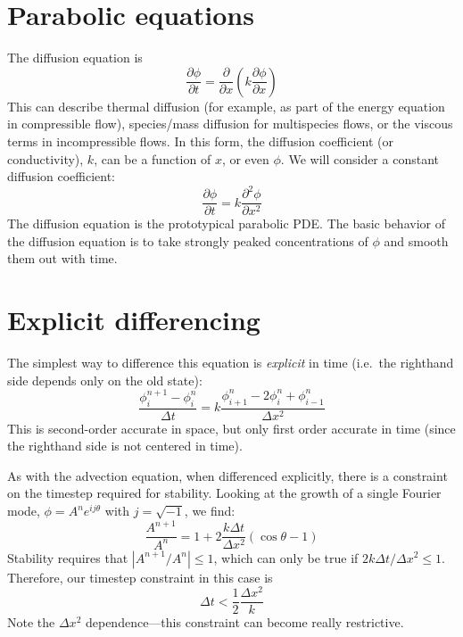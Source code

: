 
\begin{quote}
\end{quote}

\section{Parabolic equations}

The diffusion equation is
\begin{equation}
\frac{\partial \phi}{\partial t} = 
  \frac{\partial }{\partial x} 
  \left ( k \frac{\partial \phi}{\partial x} \right )
\end{equation}
This can describe thermal diffusion (for example, as part of the energy
equation in compressible flow), species/mass diffusion for multispecies
flows, or the viscous terms in incompressible flows.  In this form,
the diffusion coefficient (or conductivity), $k$, can be a function
of $x$, or even $\phi$.  We will consider a constant diffusion coefficient:
\begin{equation}
\frac{\partial \phi}{\partial t} = k \frac{\partial^2 \phi}{\partial x^2}
\end{equation}
The diffusion equation is the prototypical parabolic PDE.
The basic behavior of the diffusion equation is to take strongly peaked
concentrations of $\phi$ and smooth them out with time.



\section{Explicit differencing}

The simplest way to difference this equation is {\em explicit} in time
(i.e.\ the righthand side depends only on the old state):
\begin{equation}
\frac{\phi_i^{n+1} - \phi_i^n}{\Delta t} = 
  k \frac{\phi_{i+1}^n - 2\phi_i^n + \phi_{i-1}^n}{\Delta x^2}
\end{equation}
This is second-order accurate in space, but only first order accurate in
time (since the righthand side is not centered in time).

As with the advection equation, when differenced explicitly, there is
a constraint on the timestep required for stability.  Looking at the
growth of a single Fourier mode, $\phi = A^n e^{ij\theta}$ with $j =
\sqrt{-1}$, we find:
\begin{equation}
\frac{A^{n+1}}{A^n} = 1 + 2 \frac{k \Delta t}{\Delta x^2} ( \cos\theta - 1)
\end{equation}
Stability requires that $|A^{n+1}/A^n| \le 1$, which can only be true
if $2k\Delta t/\Delta x^2 \le 1$.  Therefore, our timestep
constraint in this case is
\begin{equation}
\Delta t < \frac{1}{2} \frac{\Delta x^2}{k}
\end{equation}
Note the $\Delta x^2$ dependence---this constraint can become really
restrictive.

